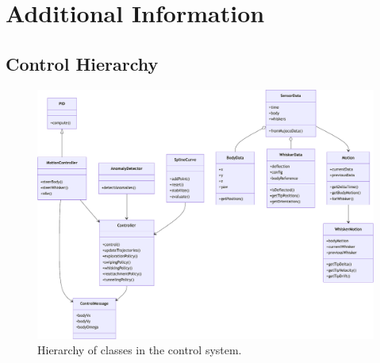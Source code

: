 \chapter{Additional Information}

\section{Control Hierarchy}
\begin{figure}[htb]
    \centering
    \includegraphics[width=\textwidth]{figures/diagrams/control-hierarchy}
    \caption{Hierarchy of classes in the control system.}
    \label{fig:control-hierarchy}
\end{figure}
